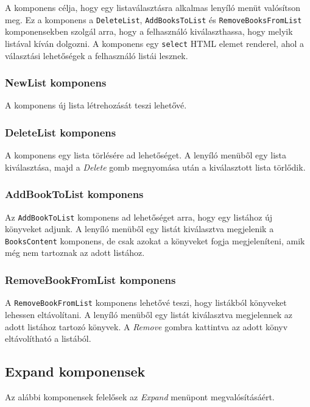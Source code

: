 A komponens célja, hogy egy listaválasztásra alkalmas lenyíló menüt valósítson meg. Ez a komponens a \texttt{DeleteList}, \texttt{AddBooksToList} és \texttt{RemoveBooksFromList} komponensekben szolgál arra, hogy a felhasználó kiválaszthassa, hogy melyik listával kíván dolgozni. A komponens egy \texttt{select} HTML elemet renderel, ahol a választási lehetőségek a felhasználó listái lesznek.

\subsubsection{NewList komponens}

A komponens új lista létrehozását teszi lehetővé.

\subsubsection{DeleteList komponens}

A komponens egy lista törlésére ad lehetőséget. A lenyíló menüből egy lista kiválasztása, majd a \textit{Delete} gomb megnyomása után a kiválasztott lista törlődik.

\subsubsection{AddBookToList komponens}

Az \texttt{AddBookToList} komponens ad lehetőséget arra, hogy egy listához új könyveket adjunk. A lenyíló menüből egy listát kiválasztva megjelenik a \texttt{BooksContent} komponens, de csak azokat a könyveket fogja megjeleníteni, amik még nem tartoznak az adott listához.

\subsubsection{RemoveBookFromList komponens}

A \texttt{RemoveBookFromList} komponens lehetővé teszi, hogy listákból könyveket lehessen eltávolítani. A lenyíló menüből egy listát kiválasztva megjelennek az adott listához tartozó könyvek. A \textit{Remove} gombra kattintva az adott könyv eltávolítható a listából.

\subsection{Expand komponensek}

Az alábbi komponensek felelősek az \textit{Expand} menüpont megvalósításáért.

